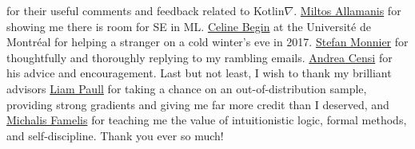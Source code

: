 for their useful comments and feedback related to Kotlin$\nabla$. \href{https://miltos.allamanis.com/}{Miltos Allamanis} for showing me there is room for SE in ML. \href{https://diro.umontreal.ca/accueil/}{Celine Begin} at the Universit\'e de Montr\'eal for helping a stranger on a cold winter's eve in 2017. \href{https://www.iro.umontreal.ca/~monnier/}{Stefan Monnier} for thoughtfully and thoroughly replying to my rambling emails. \href{https://censi.science/}{Andrea Censi} for his advice and encouragement. Last but not least, I wish to thank my brilliant advisors \href{http://liampaull.ca/}{Liam Paull} for taking a chance on an out-of-distribution sample, providing strong gradients and giving me far more credit than I deserved, and \href{https://michalis.famelis.info/}{Michalis Famelis} for teaching me the value of intuitionistic logic, formal methods, and self-discipline. Thank you ever so much!